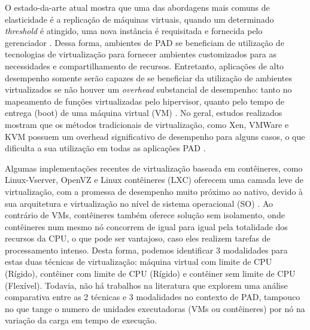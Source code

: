 \documentclass[twoside,english,brazilian]{UNISINOSartigo}
\begin{document}
O estado-da-arte atual mostra que uma das abordagens mais comuns de elasticidade é a replicação de máquinas virtuais, quando um determinado \textit{threshold} é atingido, uma nova instância é requisitada e fornecida pelo gerenciador \cite{7090978,7185168,6217477}. Dessa forma, ambientes de PAD se beneficiam de utilização de tecnologias de virtualização para fornecer ambientes customizados para as necessidades e compartilhamento de recursos. Entretanto, aplicações de alto desempenho somente serão capazes de se beneficiar da utilização de ambientes virtualizados se não houver um \textit{overhead} substancial de desempenho: tanto no mapeamento de funções virtualizadas pelo hipervisor, quanto pelo tempo de entrega (boot) de uma máquina virtual (VM) \cite{Xavier2013}. No geral, estudos realizados mostram que os métodos tradicionais de virtualização, como Xen, VMWare e KVM possuem um overhead significativo de desempenho para alguns casos, o que dificulta a sua utilização em todas as aplicações PAD \cite{Zheng2017}. 

Algumas implementações recentes de virtualização baseada em contêineres, como Linux-Vserver, OpenVZ e Linux contêineres (LXC) oferecem uma camada leve de virtualização, com a promessa de desempenho muito próximo ao nativo, devido à sua arquitetura e virtualização no nível de sistema operacional (SO) \cite{Bernstein2014}. Ao contrário de VMs, contêineres também oferece solução sem isolamento, onde contêineres num mesmo nó concorrem de igual para igual pela totalidade dos recursos da CPU, o que pode ser vantajoso, caso eles realizem tarefas de processamento intenso. Desta forma, podemos identificar 3 modalidades para estas duas técnicas de virtualização: máquina virtual com limite de CPU (Rígido), contêiner com limite de CPU (Rígido) e contêiner sem limite de CPU (Flexível). Todavia, não há trabalhos na literatura que explorem uma análise comparativa entre as 2 técnicas e 3 modalidades no contexto de PAD, tampouco no que tange o numero de unidades executadoras (VMs ou contêineres) por nó na variação da carga em tempo de execução.
\end{document}
